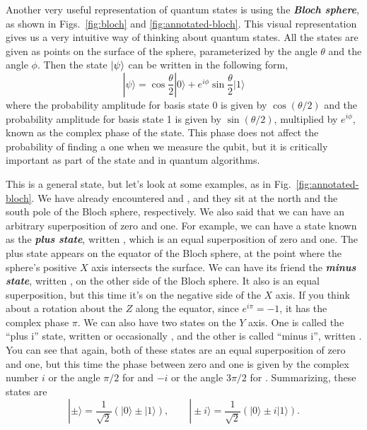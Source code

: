 Another very useful representation of quantum states is using the \textbf{\emph{Bloch sphere}}, as shown in Figs.~\ref{fig:bloch} and \ref{fig:annotated-bloch}. This visual representation gives us a very intuitive way of thinking about quantum states. All the states are given as points on the surface of the sphere, parameterized by the angle $\theta$ and the angle $\phi$. Then the state $\left| \psi \right\rangle$ can be written in the following form,
\begin{equation}
|\psi\rangle=\cos \frac{\theta}{2}|0\rangle+e^{i \phi} \sin \frac{\theta}{2}|1\rangle
\end{equation}
where the probability amplitude for basis state 0 is given by $\cos(\theta/2)$ and the probability amplitude for basis state 1 is given by $\sin(\theta/2)$, multiplied by $e^{i \phi}$, known as the complex phase of the state. This phase does not affect the probability of finding a one when we measure the qubit, but it is critically important as part of the state and in quantum algorithms.

This \ket{\psi} is a general state, but let's look at some examples, as in Fig.~\ref{fig:annotated-bloch}. We have already encountered  and , and they sit at the north and the south pole of the Bloch sphere, respectively. We also said that we can have an arbitrary superposition of zero and one. For example, we can have a state known as the \textbf{\emph{plus state}}, written \ket{+}, which is an equal superposition of zero and one. The plus state appears on the equator of the Bloch sphere, at the point where the sphere's positive $X$ axis intersects the surface. We can have its friend the \textbf{\emph{minus state}}, written \ket{-}, on the other side of the Bloch sphere. It also is an equal superposition, but this time it's on the negative side of the $X$ axis.  If you think about a rotation about the $Z$ along the equator, since $e^{i\pi} = -1$, it has the complex phase $\pi$.  We can also have two states on the $Y$ axis. One is called the ``plus i'' state, written  or occasionally , and the other is called ``minus i'', written . You can see that again, both of these states are an equal superposition of zero and one, but this time the phase between zero and one is given by the complex number $i$ or the angle $\pi/2$ for  and $-i$ or the angle $3\pi/2$ for \ket{-}.  Summarizing, these states are
\begin{equation}
    |\pm\rangle=\frac{1}{\sqrt{2}}(|0\rangle \pm|1\rangle), \qquad|\pm i\rangle=\frac{1}{\sqrt{2}}(|0\rangle \pm i|1\rangle).
\end{equation}

